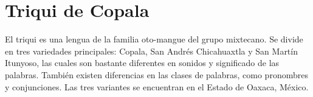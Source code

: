 \section*{Triqui de Copala}

\noindent El triqui es una lengua de la familia oto-mangue del grupo mixtecano. Se divide en tres variedades principales: Copala, San Andrés Chicahuaxtla y San Martín Itunyoso, las cuales son bastante diferentes en sonidos y significado de las palabras. También existen diferencias en las clases de palabras, como pronombres y conjunciones. Las tres variantes se encuentran en el Estado de Oaxaca, México.